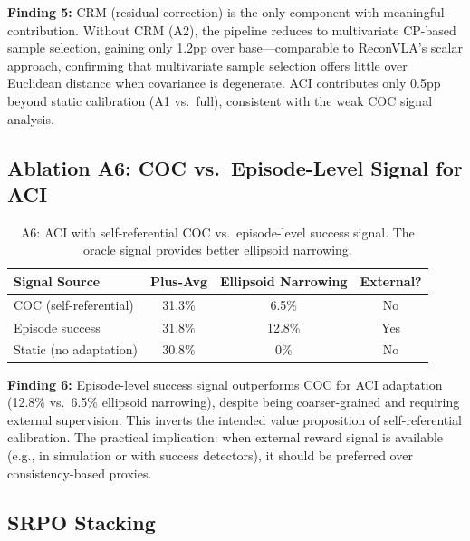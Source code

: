 \documentclass[letterpaper]{article}
\begin{document}
\textbf{Finding 5:} CRM (residual correction) is the only component with meaningful contribution. Without CRM (A2), the pipeline reduces to multivariate CP-based sample selection, gaining only 1.2pp over base---comparable to ReconVLA's scalar approach, confirming that multivariate sample selection offers little over Euclidean distance when covariance is degenerate. ACI contributes only 0.5pp beyond static calibration (A1 vs.\ full), consistent with the weak COC signal analysis.

\subsection{Ablation A6: COC vs.\ Episode-Level Signal for ACI}
\label{sec:exp-a6}

\begin{table}[h]
\centering
\caption{A6: ACI with self-referential COC vs.\ episode-level success signal. The oracle signal provides better ellipsoid narrowing.}
\label{tab:a6}
\begin{tabular}{lccc}
\toprule
Signal Source & Plus-Avg & Ellipsoid Narrowing & External? \\
\midrule
COC (self-referential) & 31.3\% & 6.5\% & No \\
Episode success & 31.8\% & 12.8\% & Yes \\
Static (no adaptation) & 30.8\% & 0\% & No \\
\bottomrule
\end{tabular}
\end{table}

\textbf{Finding 6:} Episode-level success signal outperforms COC for ACI adaptation (12.8\% vs.\ 6.5\% ellipsoid narrowing), despite being coarser-grained and requiring external supervision. This inverts the intended value proposition of self-referential calibration. The practical implication: when external reward signal is available (e.g., in simulation or with success detectors), it should be preferred over consistency-based proxies.

\subsection{SRPO Stacking}
\label{sec:exp-srpo}
\end{document}
